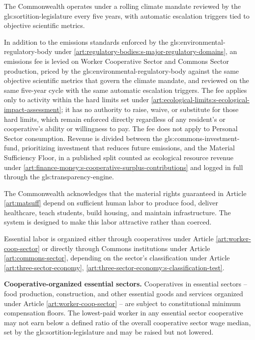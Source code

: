 The Commonwealth operates under a rolling climate mandate reviewed by the \gls{gls:sortition-legislature} every five years, with automatic escalation triggers tied to objective scientific metrics.

In addition to the emissions standards enforced by the \gls{gls:environmental-regulatory-body} under \ref{art:regulatory-bodies:s-major-regulatory-domains}, an emissions fee is levied on Worker Cooperative Sector and Commons Sector production, priced by the \gls{gls:environmental-regulatory-body} against the same objective scientific metrics that govern the climate mandate, and reviewed on the same five-year cycle with the same automatic escalation triggers. The fee applies only to activity within the hard limits set under \ref{art:ecological-limits:s-ecological-impact-assessment}; it has no authority to raise, waive, or substitute for those hard limits, which remain enforced directly regardless of any resident's or cooperative's ability or willingness to pay. The fee does not apply to Personal Sector consumption. Revenue is divided between the \gls{gls:commons-investment-fund}, prioritizing investment that reduces future emissions, and the Material Sufficiency Floor, in a published split counted as ecological resource revenue under \ref{art:finance-money:s-cooperative-surplus-contributions} and logged in full through the \gls{gls:transparency-engine}.


The Commonwealth acknowledges that the material rights guaranteed in Article \ref{art:matsuff} depend on sufficient human labor to produce food, deliver healthcare, teach students, build housing, and maintain infrastructure. The system is designed to make this labor attractive rather than coerced.

Essential labor is organized either through cooperatives under Article \ref{art:worker-coop-sector} or directly through Commons institutions under Article \ref{art:commons-sector}, depending on the sector's classification under Article \ref{art:three-sector-economy}, \ref{art:three-sector-economy:s-classification-test}.

\textbf{Cooperative-organized essential sectors.} Cooperatives in essential sectors -- food production, construction, and other essential goods and services organized under Article \ref{art:worker-coop-sector} -- are subject to constitutional minimum compensation floors. The lowest-paid worker in any essential sector cooperative may not earn below a defined ratio of the overall cooperative sector wage median, set by the \gls{gls:sortition-legislature} and may be raised but not lowered.

